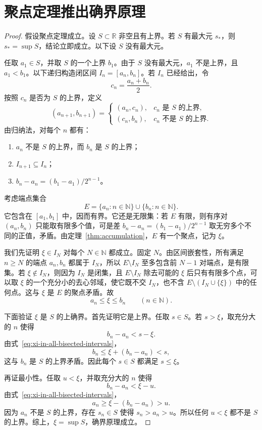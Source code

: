 \documentclass[UTF8,12pt,a4paper,fontset=fandol]{ctexart}
\begin{document}
\section{聚点定理推出确界原理}

\begin{proof}
  假设聚点定理成立。设 $S\subset\mathbb R$ 非空且有上界。若 $S$ 有最大元 $s_*$，则 $s_*=\sup S$，结论立即成立。以下设 $S$ 没有最大元。

  任取 $a_1\in S$，并取 $S$ 的一个上界 $b_1$。由于 $S$ 没有最大元，$a_1$ 不是上界，且 $a_1<b_1$。以下递归构造闭区间 $I_n=[a_n,b_n]$。若 $I_n$ 已经给出，令
  \[
    c_n=\frac{a_n+b_n}{2}.
  \]
  按照 $c_n$ 是否为 $S$ 的上界，定义
  \begin{equation}
    (a_{n+1},b_{n+1})=
    \begin{cases}
      (a_n,c_n), & c_n\text{ 是 }S\text{ 的上界},\\
      (c_n,b_n), & c_n\text{ 不是 }S\text{ 的上界}.
    \end{cases}
    \label{eq:sup-bisection}
  \end{equation}
  由归纳法，对每个 $n$ 都有：
  \begin{enumerate}
    \item $a_n$ 不是 $S$ 的上界，而 $b_n$ 是 $S$ 的上界；
    \item $I_{n+1}\subseteq I_n$；
    \item $b_n-a_n=(b_1-a_1)/2^{n-1}$。
  \end{enumerate}

  考虑端点集合
  \[
    E=\{a_n:n\in\mathbb N\}\cup\{b_n:n\in\mathbb N\}.
  \]
  它包含在 $[a_1,b_1]$ 中，因而有界。它还是无限集：若 $E$ 有限，则有序对 $(a_n,b_n)$ 只能取有限多个值，可是差 $b_n-a_n=(b_1-a_1)/2^{n-1}$ 取无穷多个不同的正值，矛盾。由定理~\ref{thm:accumulation}，$E$ 有一个聚点，记为 $\xi$。

  我们先证明 $\xi\in I_N$ 对每个 $N\in\mathbb N$ 都成立。固定 $N$。由区间嵌套性，所有满足 $n\geq N$ 的端点 $a_n,b_n$ 都属于 $I_N$，所以 $E\setminus I_N$ 至多包含前 $N-1$ 对端点，是有限集。若 $\xi\notin I_N$，则因为 $I_N$ 是闭集，且 $E\setminus I_N$ 除去可能的 $\xi$ 后只有有限多个点，可以取 $\xi$ 的一个充分小的去心邻域，使它既不交 $I_N$，也不含 $E\setminus(I_N\cup\{\xi\})$ 中的任何点。这与 $\xi$ 是 $E$ 的聚点矛盾。故
  \begin{equation}
    a_n\leq\xi\leq b_n\qquad(n\in\mathbb N).
    \label{eq:xi-in-all-bisected-intervals}
  \end{equation}

  下面验证 $\xi$ 是 $S$ 的上确界。首先证明它是上界。任取 $s\in S$。若 $s>\xi$，取充分大的 $n$ 使得
  \[
    b_n-a_n<s-\xi.
  \]
  由式~\eqref{eq:xi-in-all-bisected-intervals}，
  \[
    b_n\leq\xi+(b_n-a_n)<s,
  \]
  这与 $b_n$ 是 $S$ 的上界矛盾。因此每个 $s\in S$ 都满足 $s\leq\xi$。

  再证最小性。任取 $u<\xi$，并取充分大的 $n$ 使得
  \[
    b_n-a_n<\xi-u.
  \]
  由式~\eqref{eq:xi-in-all-bisected-intervals}，
  \[
    a_n\geq\xi-(b_n-a_n)>u.
  \]
  因为 $a_n$ 不是 $S$ 的上界，存在 $s_n\in S$ 使得 $s_n>a_n>u$。所以任何 $u<\xi$ 都不是 $S$ 的上界。综上，$\xi=\sup S$，确界原理成立。
\end{proof}
\end{document}
